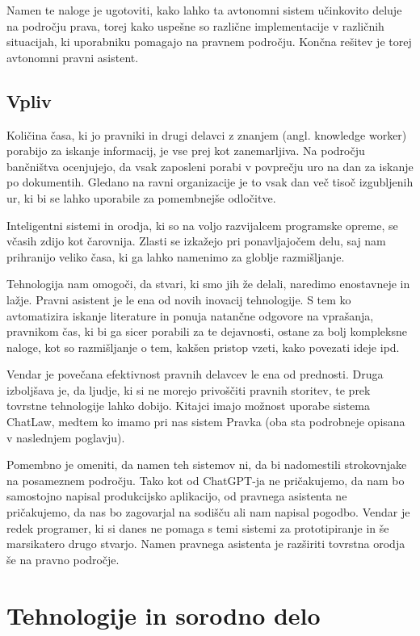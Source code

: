 \documentclass[a4paper,12pt,openright]{book}
\begin{document}
Namen te naloge je ugotoviti, kako lahko ta avtonomni sistem učinkovito deluje na področju prava, torej kako uspešne so različne implementacije v različnih situacijah, ki uporabniku pomagajo na pravnem področju. Končna rešitev je torej avtonomni pravni asistent.

\section{Vpliv}

Količina časa, ki jo pravniki in drugi delavci z znanjem (angl. knowledge worker) porabijo za iskanje informacij, je vse prej kot zanemarljiva. Na področju bančništva ocenjujejo, da vsak zaposleni porabi v povprečju uro na dan za iskanje po dokumentih. Gledano na ravni organizacije je to vsak dan več tisoč izgubljenih ur, ki bi se lahko uporabile za pomembnejše odločitve.

Inteligentni sistemi in orodja, ki so na voljo razvijalcem programske opreme, se včasih zdijo kot čarovnija. Zlasti se izkažejo pri ponavljajočem delu, saj nam prihranijo veliko časa, ki ga lahko namenimo za globlje razmišljanje.

Tehnologija nam omogoči, da stvari, ki smo jih že delali, naredimo enostavneje in lažje. Pravni asistent je le ena od novih inovacij tehnologije. S tem ko avtomatizira iskanje literature in ponuja natančne odgovore na vprašanja, pravnikom čas, ki bi ga sicer porabili za te dejavnosti, ostane za bolj kompleksne naloge, kot so razmišljanje o tem, kakšen pristop vzeti, kako povezati ideje ipd.

Vendar je povečana efektivnost pravnih delavcev le ena od prednosti. Druga izboljšava je, da ljudje, ki si ne morejo privoščiti pravnih storitev, te prek tovrstne tehnologije lahko dobijo. Kitajci imajo možnost uporabe sistema ChatLaw, medtem ko imamo pri nas sistem Pravka (oba sta podrobneje opisana v naslednjem poglavju).

Pomembno je omeniti, da namen teh sistemov ni, da bi nadomestili strokovnjake na posameznem področju. Tako kot od ChatGPT-ja ne pričakujemo, da nam bo samostojno napisal produkcijsko aplikacijo, od pravnega asistenta ne pričakujemo, da nas bo zagovarjal na sodišču ali nam napisal pogodbo. Vendar je redek programer, ki si danes ne pomaga s temi sistemi za prototipiranje in še marsikatero drugo stvarjo. Namen pravnega asistenta je razširiti tovrstna orodja še na pravno področje.

\chapter{Tehnologije in sorodno delo}
\label{ch1}
\end{document}
